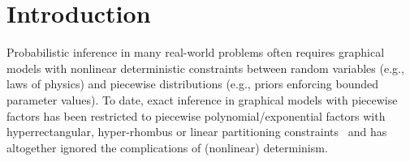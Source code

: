 \documentclass{article} %
\begin{document}
\begin{abstract}

\end{abstract}

\section{Introduction}
\label{sect:intro}

Probabilistic inference in many real-world problems often requires
graphical models with nonlinear deterministic constraints between
random variables (e.g., laws of physics) and piecewise distributions
(e.g., priors enforcing bounded parameter values).  To date, exact
inference in graphical models with piecewise factors has been
restricted to piecewise polynomial/exponential factors with
hyperrectangular, hyper-rhombus or linear partitioning
constraints~\cite{shenoy2011inference,shenoy2012two,Sanner:12} and
has altogether ignored the complications of (nonlinear) determinism.
\end{document}
